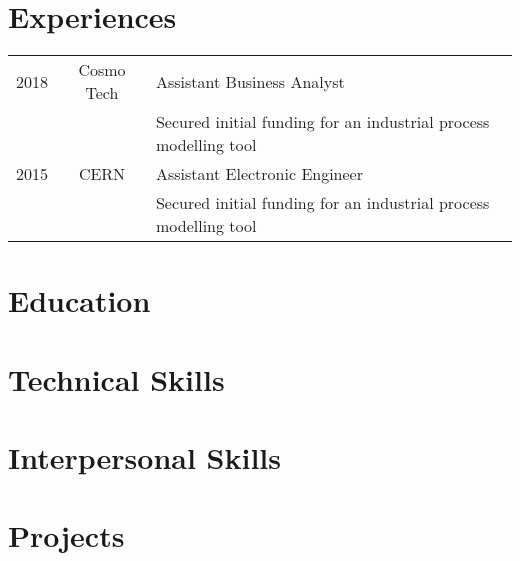 \documentclass[12pt]{report}
\begin{document}
\section*{Experiences}
\begin{table}[H]
    \begin{tabular}{lcl}
        \toprule
        2018 & Cosmo Tech & Assistant Business Analyst                                       \\
             &            & Secured initial funding for an industrial process modelling tool \\
        \midrule
        2015 & CERN       & Assistant Electronic Engineer                                    \\
             &            & Secured initial funding for an industrial process modelling tool \\
        \bottomrule
    \end{tabular}
\end{table}

\section*{Education}

\section*{Technical Skills}

\section*{Interpersonal Skills}

\section*{Projects}
\end{document}
